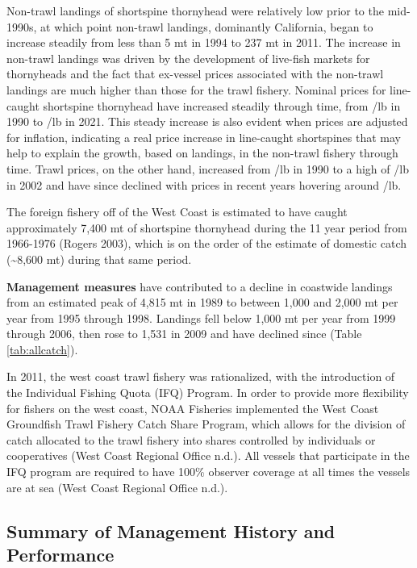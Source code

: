 \documentclass[11pt,
  english,
  letterpaper,
]{article}
\begin{document}
Non-trawl landings of shortspine thornyhead were relatively low prior to the mid-1990s, at which point non-trawl landings, dominantly California, began to increase steadily from less than 5 mt in 1994 to 237 mt in 2011. The increase in non-trawl landings was driven by the development of live-fish markets for thornyheads and the fact that ex-vessel prices associated with the non-trawl landings are much higher than those for the trawl fishery. Nominal prices for line-caught shortspine thornyhead have increased steadily through time, from /lb in 1990 to /lb in 2021. This steady increase is also evident when prices are adjusted for inflation, indicating a real price increase in line-caught shortspines that may help to explain the growth, based on landings, in the non-trawl fishery through time. Trawl prices, on the other hand, increased from /lb in 1990 to a high of /lb in 2002 and have since declined with prices in recent years hovering around /lb.

The foreign fishery off of the West Coast is estimated to have caught approximately 7,400 mt of shortspine thornyhead during the 11 year period from 1966-1976 (Rogers 2003), which is on the order of the estimate of domestic catch (\textasciitilde8,600 mt) during that same period.

\textbf{Management measures} have contributed to a decline in coastwide landings from an estimated peak of 4,815 mt in 1989 to between 1,000 and 2,000 mt per year from 1995 through 1998. Landings fell below 1,000 mt per year from 1999 through 2006, then rose to 1,531 in 2009 and have declined since (Table \ref{tab:allcatch}).

In 2011, the west coast trawl fishery was rationalized, with the introduction of the Individual Fishing Quota (IFQ) Program. In order to provide more flexibility for fishers on the west coast, NOAA Fisheries implemented the West Coast Groundfish Trawl Fishery Catch Share Program, which allows for the division of catch allocated to the trawl fishery into shares controlled by individuals or cooperatives (West Coast Regional Office n.d.). All vessels that participate in the IFQ program are required to have 100\% observer coverage at all times the vessels are at sea (West Coast Regional Office n.d.).

\hypertarget{summary-of-management-history-and-performance}{%
\subsection{Summary of Management History and Performance}\label{summary-of-management-history-and-performance}}
\end{document}
